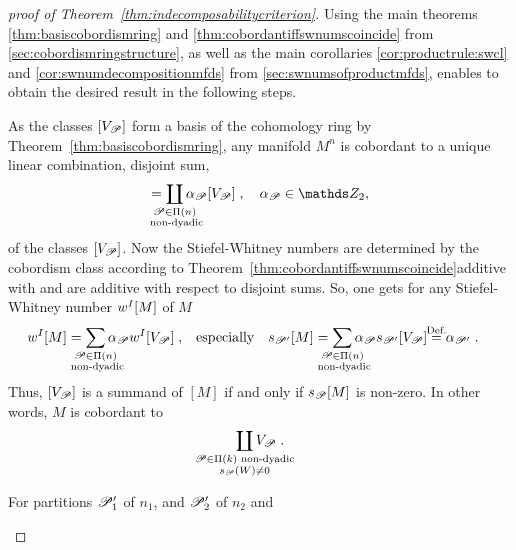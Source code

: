 \begin{proof}[proof of Theorem~\ref{thm:indecomposabilitycriterion}]
  Using the main theorems \ref{thm:basiscobordismring} and
  \ref{thm:cobordantiffswnumscoincide} from
  \autoref{sec:cobordismringstructure}, as well as the main
  corollaries \ref{cor:productrule:swcl} and
  \ref{cor:swnumdecompositionmfds} from
  \autoref{sec:swnumsofproductmfds}, enables to obtain the
  desired result in the following steps.
  \begin{steps}
  \item\label{item:manifoldbasisrepr}
    As the classes $[V_{\mathscr{P}}]$ form a basis of the cohomology ring by
    Theorem~\ref{thm:basiscobordismring}, any manifold $M^n$ is
    cobordant to a unique linear combination, \idest disjoint sum,
    \begin{gather*}
      [M] = \coprod_{\mathclap{\substack{
            \Part\in\PartitionsOf n \\\text{ non-dyadic}
          }}} \alpha_\Part [V_\Part]
      \;,\quad
      \alpha_\Part \in \Zmod2,
    \end{gather*}
    of the classes $[V_{\mathscr{P}}]$.
    Now the Stiefel-Whitney numbers are determined by the cobordism
    class according to Theorem~\ref{thm:cobordantiffswnumscoincide}additive with
    and are additive with respect to disjoint sums.
    So, one gets for any Stiefel-Whitney number $w^{I}[M]$ of $M$
    \begin{align*}
      \wsnum{I}{M}
      &= \sum_{\mathclap{\substack{
        \Part\in\PartitionsOf n \\\text{ non-dyadic}
      }}} \alpha_\Part \wsnum{I}{V_\Part}
      \;,
      &\text{especially}
      &&\snum{\Part'}{M}
      &= \sum_{\mathclap{\substack{
        \Part\in\PartitionsOf n \\\text{ non-dyadic}
      }}} \alpha_\Part \snum{\Part'}{V_\Part}
      \cequalsby{Def.} \alpha_{\Part'}
      \;.
    \end{align*}
    Thus, $[V_{\mathscr{P}}]$ is a summand of $[M]$ if and only if
    $s_{\mathscr{P}}[M]$ is non-zero. In other words, $M$ is cobordant to
    \begin{gather*}
      \coprod_{\mathclap{\substack{
            \Part\in\PartitionsOf k \text{ non-dyadic}\\
            \s{\Part}(W)\neq 0
          }}} V_\Part
      \;.
    \end{gather*}
  \item\label{item:productpartitions}
    For partitions $\mathscr{P}_1'$ of $n_1$, and $\mathscr{P}_2'$ of $n_2$ and

\end{steps}
\end{proof}
